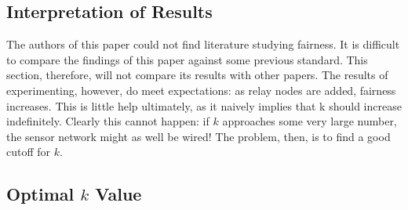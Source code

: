 \subsection{Interpretation of Results}

The authors of this paper could not find literature studying fairness.  It is difficult to compare the findings of this paper against some previous standard.  This section, therefore, will not compare its results with other papers.  The results of experimenting, however, do meet expectations: as relay nodes are added, fairness increases.  This is little help ultimately, as it naively implies that k should increase indefinitely.  Clearly this cannot happen: if $k$ approaches some very large number, the sensor network might as well be wired!  The problem, then, is to find a good cutoff for $k$.

\subsection{Optimal $k$ Value}

